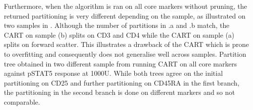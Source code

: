Furthermore, when the algorithm is ran on all core markers without pruning, 
the returned partitioning is very different depending on the sample, as illustrated on
two samples in .
Although the number of partitions in .a and .b
match, the CART on sample (b) splits on CD3 and CD4 while the CART on sample (a) splits on forward scatter.
This illustrates a drawback of the CART which is prone to overfitting and consequently does not generalise well across samples.
{ Partition tree obtained in two different sample from running CART on all core markers against pSTAT5 response at 1000U. }
{
  While both trees agree on the initial partitioning on CD25 and further partitioning on CD45RA in the first branch,
  the partitioning in the second branch is done on different markers and so not comparable.
}




%


